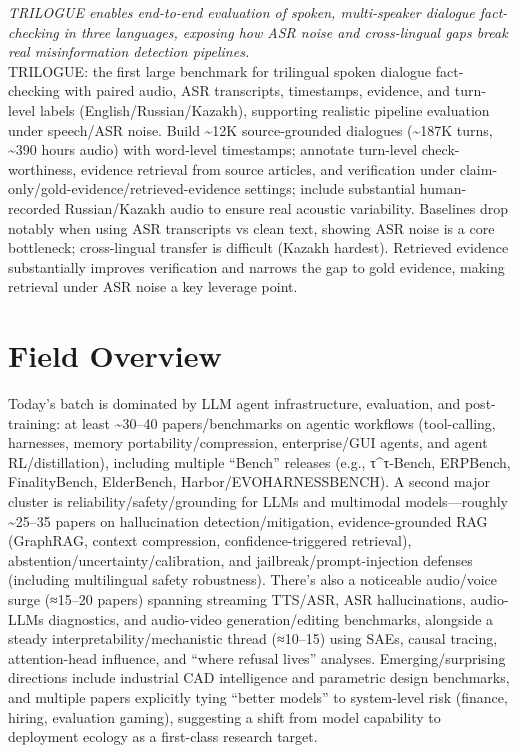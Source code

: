 \documentclass[12pt,letterpaper]{article}
\begin{document}
{\small\textit{TRILOGUE enables end-to-end evaluation of spoken, multi-speaker dialogue fact-checking in three languages, exposing how ASR noise and cross-lingual gaps break real misinformation detection pipelines.}}\\[1pt]
{\footnotesize TRILOGUE: the first large benchmark for trilingual spoken dialogue fact-checking with paired audio, ASR transcripts, timestamps, evidence, and turn-level labels (English/Russian/Kazakh), supporting realistic pipeline evaluation under speech/ASR noise. Build \textasciitilde{}12K source-grounded dialogues (\textasciitilde{}187K turns, \textasciitilde{}390 hours audio) with word-level timestamps; annotate turn-level check-worthiness, evidence retrieval from source articles, and verification under claim-only/gold-evidence/retrieved-evidence settings; include substantial human-recorded Russian/Kazakh audio to ensure real acoustic variability. Baselines drop notably when using ASR transcripts vs clean text, showing ASR noise is a core bottleneck; cross-lingual transfer is difficult (Kazakh hardest). Retrieved evidence substantially improves verification and narrows the gap to gold evidence, making retrieval under ASR noise a key leverage point.}

\medskip



\section*{Field Overview}
{\footnotesize Today's batch is dominated by LLM agent infrastructure, evaluation, and post-training: at least \textasciitilde{}30--40 papers/benchmarks on agentic workflows (tool-calling, harnesses, memory portability/compression, enterprise/GUI agents, and agent RL/distillation), including multiple ``Bench'' releases (e.g., τ\textasciicircum{}τ-Bench, ERPBench, FinalityBench, ElderBench, Harbor/EVOHARNESSBENCH). A second major cluster is reliability/safety/grounding for LLMs and multimodal models---roughly \textasciitilde{}25--35 papers on hallucination detection/mitigation, evidence-grounded RAG (GraphRAG, context compression, confidence-triggered retrieval), abstention/uncertainty/calibration, and jailbreak/prompt-injection defenses (including multilingual safety robustness). There's also a noticeable audio/voice surge (≈15--20 papers) spanning streaming TTS/ASR, ASR hallucinations, audio-LLMs diagnostics, and audio-video generation/editing benchmarks, alongside a steady interpretability/mechanistic thread (≈10--15) using SAEs, causal tracing, attention-head influence, and ``where refusal lives'' analyses. Emerging/surprising directions include industrial CAD intelligence and parametric design benchmarks, and multiple papers explicitly tying ``better models'' to system-level risk (finance, hiring, evaluation gaming), suggesting a shift from model capability to deployment ecology as a first-class research target.}
\end{document}
